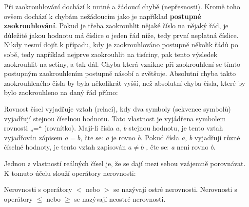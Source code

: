 Při zaokrouhlování dochází k nutné a žádoucí chybě (nepřesnosti). Kromě toho ovšem dochází k chybám nežádoucím jako je například {\bf postupné zaokrouhlování}. Pokud je třeba zaokrouhlit nějaké číslo na nějaký řád, je důležité jakou hodnotu má číslice o jeden řád níže, tedy první neplatná číslice. Nikdy nesmí dojít k případu, kdy je zaokrouhlováno postupně několik řádů po sobě, tedy například nejprve zaokrouhlit na tisíciny, pak tento výsledek zaokrouhlit na setiny, a tak dál. Chyba která vznikne při zaokrouhlení se tímto postupným zaokrouhlením postupně násobí a zvětšuje. Absolutní chyba takto zaokrouhleného čísla by byla několikrát vyšší, než absolutní chyba čísla, které by bylo zaokrouhleno na daný řád přímo:

\vskip 4mm
\vskip 4mm


Rovnost čísel vyjadřuje vztah (relaci), kdy dva symboly (sekvence symbolů) vyjadřují stejnou číselnou hodnotu. Tato vlastnost je vyjádřena symbolem rovnosti „=“ (rovnítko). Mají-li čísla {\it a}, {\it b} stejnou hodnotu, je tento vztah vyjadřován zápisem $ a = b $, čte se: {\it a} je rovno {\it b}. Pokud čísla {\it a}, {\it b} vyjadřují různé číselné hodnoty, je tento vztah zapisován $a \not = b$ , čte se: {\it a} není rovno {\it b}.

Jednou z vlastností reálných čísel je, že se dají mezi sebou vzájemně porovnávat. K tomuto účelu slouží operátory nerovnosti:

\vskip 4mm
\vskip 4mm

Nerovnosti s operátory $<$ nebo $>$ se nazývají ostré nerovnosti. Nerovnosti s operátory $\leq$ nebo $\geq$ se nazývají neostré nerovnosti.


